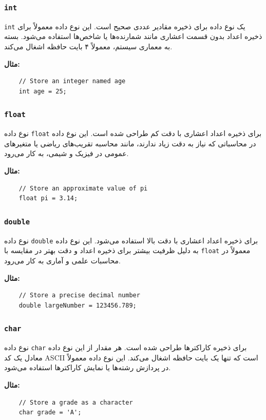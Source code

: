 \documentclass[12pt, a4paper]{report}
\begin{document}
\subsubsection{\texttt{int}}
\texttt{int} یک نوع داده برای ذخیره مقادیر عددی صحیح است. این نوع داده معمولاً برای ذخیره اعداد بدون قسمت اعشاری مانند شمارنده‌ها یا شاخص‌ها استفاده می‌شود. بسته به معماری سیستم، معمولاً ۴ بایت حافظه اشغال می‌کند.


\textbf{مثال:}
\LTR
\begin{lstlisting}
	// Store an integer named age
	int age = 25;
\end{lstlisting}
\RTL

\subsubsection{ \texttt{float}}
نوع داده \texttt{float} برای ذخیره اعداد اعشاری با دقت کم طراحی شده است. این نوع داده در محاسباتی که نیاز به دقت زیاد ندارند، مانند محاسبه تقریب‌های ریاضی یا متغیرهای عمومی در فیزیک و شیمی، به کار می‌رود.

\textbf{مثال:}
\LTR
\begin{lstlisting}
	// Store an approximate value of pi
	float pi = 3.14;
\end{lstlisting}
\RTL
\subsubsection{\texttt{double}}
نوع داده \texttt{double} برای ذخیره اعداد اعشاری با دقت بالا استفاده می‌شود. این نوع داده به دلیل ظرفیت بیشتر برای ذخیره اعداد و دقت بهتر در مقایسه با \texttt{float} معمولاً در محاسبات علمی و آماری به کار می‌رود.

\textbf{مثال:}
\LTR
\begin{lstlisting}
	// Store a precise decimal number
	double largeNumber = 123456.789;
\end{lstlisting}
\RTL
\subsubsection{ \texttt{char}}
نوع داده \texttt{char} برای ذخیره کاراکترها طراحی شده است. هر مقدار از این نوع داده معادل یک کد ASCII است که تنها یک بایت حافظه اشغال می‌کند. این نوع داده معمولاً در پردازش رشته‌ها یا نمایش کاراکترها استفاده می‌شود.

\textbf{مثال:}
\LTR
\begin{lstlisting}
	// Store a grade as a character
	char grade = 'A';
\end{lstlisting}
\RTL
\end{document}
